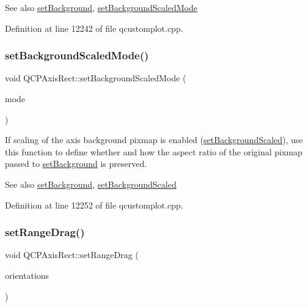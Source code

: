 \begin{DoxySeeAlso}{See also}
\hyperlink{class_q_c_p_axis_rect_af615ab5e52b8e0a9a0eff415b6559db5}{set\+Background}, \hyperlink{class_q_c_p_axis_rect_a5ef77ea829c9de7ba248e473f48f7305}{set\+Background\+Scaled\+Mode} 
\end{DoxySeeAlso}


Definition at line 12242 of file qcustomplot.\+cpp.

\mbox{\label{class_q_c_p_axis_rect_a5ef77ea829c9de7ba248e473f48f7305}} 
\subsubsection{\texorpdfstring{set\+Background\+Scaled\+Mode()}{setBackgroundScaledMode()}}
{\footnotesize\ttfamily void Q\+C\+P\+Axis\+Rect\+::set\+Background\+Scaled\+Mode (\begin{DoxyParamCaption}\item[{Qt\+::\+Aspect\+Ratio\+Mode}]{mode }\end{DoxyParamCaption})}

If scaling of the axis background pixmap is enabled (\hyperlink{class_q_c_p_axis_rect_ae6d36c3e0e968ffb991170a018e7b503}{set\+Background\+Scaled}), use this function to define whether and how the aspect ratio of the original pixmap passed to \hyperlink{class_q_c_p_axis_rect_af615ab5e52b8e0a9a0eff415b6559db5}{set\+Background} is preserved. \begin{DoxySeeAlso}{See also}
\hyperlink{class_q_c_p_axis_rect_af615ab5e52b8e0a9a0eff415b6559db5}{set\+Background}, \hyperlink{class_q_c_p_axis_rect_ae6d36c3e0e968ffb991170a018e7b503}{set\+Background\+Scaled} 
\end{DoxySeeAlso}


Definition at line 12252 of file qcustomplot.\+cpp.

\mbox{\label{class_q_c_p_axis_rect_ae6aef2f7211ba6097c925dcd26008418}} 
\subsubsection{\texorpdfstring{set\+Range\+Drag()}{setRangeDrag()}}
{\footnotesize\ttfamily void Q\+C\+P\+Axis\+Rect\+::set\+Range\+Drag (\begin{DoxyParamCaption}\item[{Qt\+::\+Orientations}]{orientations }\end{DoxyParamCaption})}

